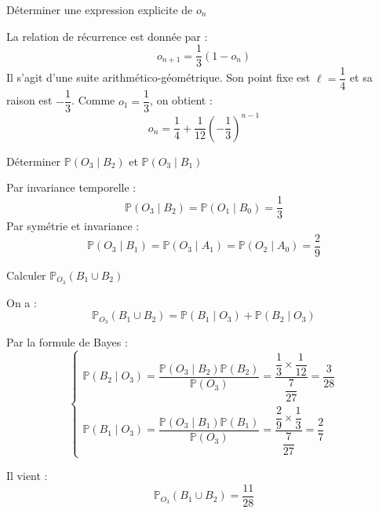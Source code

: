 \documentclass[10pt,a4paper]{article}
\begin{document}
\q Déterminer une expression explicite de \( o_n \)

La relation de récurrence est donnée par :
\[
o_{n+1} = \dfrac{1}{3} (1 - o_n)
\]
Il s'agit d'une suite arithmético-géométrique. Son point fixe est \( \ell = \dfrac{1}{4} \) et sa
raison est \( -\dfrac{1}{3} \). Comme \( o_1 = \dfrac{1}{3} \), on obtient :
\[
o_n = \dfrac{1}{4} + \dfrac{1}{12} \left( -\dfrac{1}{3} \right)^{n-1}
\]

\q Déterminer \( \mathbb{P}(O_3 \mid B_2) \) et \( \mathbb{P}(O_3 \mid B_1) \)

Par invariance temporelle :
\[
\mathbb{P}(O_3 \mid B_2) = \mathbb{P}(O_1 \mid B_0) = \dfrac{1}{3}
\]
Par symétrie et invariance :
\[
\mathbb{P}(O_3 \mid B_1) = \mathbb{P}(O_3 \mid A_1) = \mathbb{P}(O_2 \mid A_0) = \dfrac{2}{9}
\]

\q Calculer \( \mathbb{P}_{O_3}(B_1 \cup B_2) \)

On a :
\[
\mathbb{P}_{O_3}(B_1 \cup B_2) = \mathbb{P}(B_1 \mid O_3) + \mathbb{P}(B_2 \mid O_3)
\]

Par la formule de Bayes :
\[
\begin{cases}
\mathbb{P}(B_2 \mid O_3) = \dfrac{\mathbb{P}(O_3 \mid B_2) \mathbb{P}(B_2)}{\mathbb{P}(O_3)} = \dfrac{\dfrac{1}{3} \times \dfrac{1}{12}}{\dfrac{7}{27}} = \dfrac{3}{28} \\
\mathbb{P}(B_1 \mid O_3) = \dfrac{\mathbb{P}(O_3 \mid B_1) \mathbb{P}(B_1)}{\mathbb{P}(O_3)} = \dfrac{\dfrac{2}{9} \times \dfrac{1}{3}}{\dfrac{7}{27}} = \dfrac{2}{7}
\end{cases}
\]

Il vient :
\[
\mathbb{P}_{O_3}(B_1 \cup B_2) = \dfrac{11}{28}
\]
\end{document}
